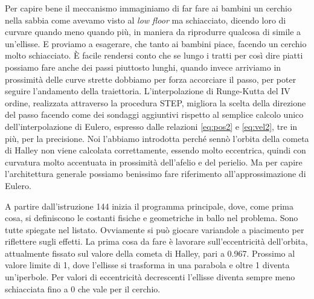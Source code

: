 Per capire bene il meccanismo immaginiamo di far fare ai bambini un cerchio nella sabbia come avevamo visto al \textit{low floor} ma schiacciato, dicendo loro di curvare quando meno quando più, in maniera da riprodurre qualcosa di simile a un'ellisse. E proviamo a esagerare, che tanto ai bambini piace, facendo un cerchio molto schiacciato. È facile rendersi conto che se lungo i tratti per così dire piatti possiamo fare anche dei passi piuttosto lunghi, quando invece arriviamo in prossimità delle curve strette dobbiamo per forza accorciare il passo, per poter seguire l'andamento della traiettoria. L'interpolazione di Runge-Kutta del IV ordine, realizzata attraverso la procedura STEP, migliora la scelta della direzione del passo facendo come dei sondaggi aggiuntivi rispetto al semplice calcolo unico dell'interpolazione di Eulero, espresso dalle relazioni \ref{eq:pos2} e \ref{eq:vel2}, tre in più, per la precisione. Noi l'abbiamo introdotta perché sennò l'orbita della cometa di Halley non viene calcolata correttamente, essendo molto eccentrica, quindi con curvatura molto accentuata in prossimità dell'afelio e del perielio. Ma per capire l'architettura generale possiamo benissimo fare riferimento all'approssimazione di Eulero.

A partire dall'istruzione 144 inizia il programma principale, dove, come prima  cosa, si  definiscono le costanti fisiche e geometriche in ballo nel problema. Sono tutte spiegate nel listato. Ovviamente si può giocare variandole a piacimento per riflettere sugli effetti. La prima cosa da fare è lavorare sull'eccentricità dell'orbita, attualmente fissato sul valore della cometa di Halley, pari a 0.967. Prossimo al valore limite di 1, dove l'ellisse si trasforma in una parabola e oltre 1 diventa un'iperbole. Per valori di eccentricità decrescenti l'ellisse diventa sempre meno schiacciata fino a 0 che vale per il cerchio.

